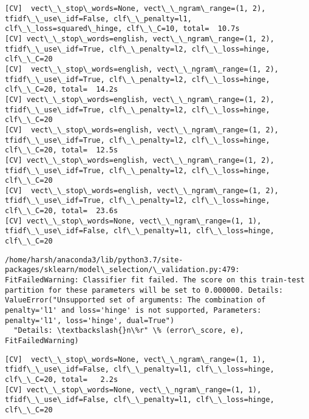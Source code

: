 \documentclass[11pt]{article}
\begin{document}
    \begin{Verbatim}[commandchars=\\\{\}]
[CV]  vect\_\_stop\_words=None, vect\_\_ngram\_range=(1, 2), tfidf\_\_use\_idf=False, clf\_\_penalty=l1, clf\_\_loss=squared\_hinge, clf\_\_C=10, total=  10.7s
[CV] vect\_\_stop\_words=english, vect\_\_ngram\_range=(1, 2), tfidf\_\_use\_idf=True, clf\_\_penalty=l2, clf\_\_loss=hinge, clf\_\_C=20 
[CV]  vect\_\_stop\_words=english, vect\_\_ngram\_range=(1, 2), tfidf\_\_use\_idf=True, clf\_\_penalty=l2, clf\_\_loss=hinge, clf\_\_C=20, total=  14.2s
[CV] vect\_\_stop\_words=english, vect\_\_ngram\_range=(1, 2), tfidf\_\_use\_idf=True, clf\_\_penalty=l2, clf\_\_loss=hinge, clf\_\_C=20 
[CV]  vect\_\_stop\_words=english, vect\_\_ngram\_range=(1, 2), tfidf\_\_use\_idf=True, clf\_\_penalty=l2, clf\_\_loss=hinge, clf\_\_C=20, total=  12.5s
[CV] vect\_\_stop\_words=english, vect\_\_ngram\_range=(1, 2), tfidf\_\_use\_idf=True, clf\_\_penalty=l2, clf\_\_loss=hinge, clf\_\_C=20 
[CV]  vect\_\_stop\_words=english, vect\_\_ngram\_range=(1, 2), tfidf\_\_use\_idf=True, clf\_\_penalty=l2, clf\_\_loss=hinge, clf\_\_C=20, total=  23.6s
[CV] vect\_\_stop\_words=None, vect\_\_ngram\_range=(1, 1), tfidf\_\_use\_idf=False, clf\_\_penalty=l1, clf\_\_loss=hinge, clf\_\_C=20 

    \end{Verbatim}

    \begin{Verbatim}[commandchars=\\\{\}]
/home/harsh/anaconda3/lib/python3.7/site-packages/sklearn/model\_selection/\_validation.py:479: FitFailedWarning: Classifier fit failed. The score on this train-test partition for these parameters will be set to 0.000000. Details: 
ValueError("Unsupported set of arguments: The combination of penalty='l1' and loss='hinge' is not supported, Parameters: penalty='l1', loss='hinge', dual=True")
  "Details: \textbackslash{}n\%r" \% (error\_score, e), FitFailedWarning)

    \end{Verbatim}

    \begin{Verbatim}[commandchars=\\\{\}]
[CV]  vect\_\_stop\_words=None, vect\_\_ngram\_range=(1, 1), tfidf\_\_use\_idf=False, clf\_\_penalty=l1, clf\_\_loss=hinge, clf\_\_C=20, total=   2.2s
[CV] vect\_\_stop\_words=None, vect\_\_ngram\_range=(1, 1), tfidf\_\_use\_idf=False, clf\_\_penalty=l1, clf\_\_loss=hinge, clf\_\_C=20 

    \end{Verbatim}
\end{document}
